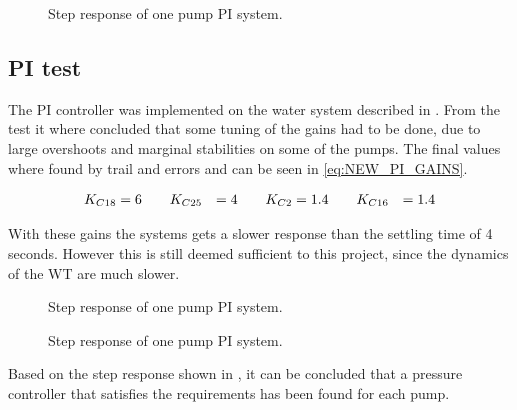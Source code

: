 \begin{figure}[H]
\centering

\caption{Step response of one pump PI system.}
\label{fig:Tikz_PI_PUMP_GAIN}
\end{figure}

\subsection*{PI test}

The PI controller was implemented on the water system described in . From the test it where concluded that some tuning of the gains had to be done, due to large overshoots and marginal stabilities on some of the pumps. The final values where found by trail and errors and can be seen in \eqref{eq:NEW_PI_GAINS}. 

\begin{equation}
\centering
	\begin{split}
	K_{C18} &= 6 \hspace{20pt} K_{C25} &= 4 \hspace{20pt} K_{C2} &= 1.4 \hspace{20pt} K_{C16} &= 1.4
	\end{split}
	\label{eq:NEW_PI_GAINS}
\end{equation}

With these gains the systems gets a slower response than the settling time of 4 seconds. However this is still deemed sufficient to this project, since the dynamics of the WT are much slower.

\begin{figure}[H]
\centering

\caption{Step response of one pump PI system.}
\label{fig:Tikz_PI_PUMP_GAIN}
\end{figure}


\begin{figure}[H]
\centering

\caption{Step response of one pump PI system.}
\label{fig:Tikz_NEW_PI_PUMP_GAIN}
\end{figure}

Based on the step response shown in , it can be concluded that a pressure controller that satisfies the requirements has been found for each pump. 

